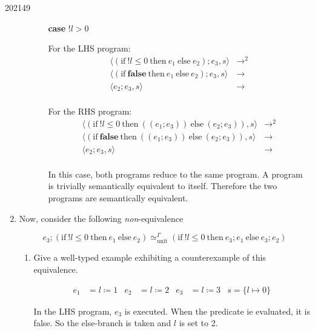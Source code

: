 \documentclass[10pt,\jkfside,a4paper]{article}
\begin{document}
\begin{examquestion}{2021}{4}{9}
\begin{enumerate}
\begin{enumerate}
\begin{itemize}
\item [\textbf{case}] $!l > 0$

For the LHS program:
\[
\begin{split}
\langle (\text{if} \ !l \leq 0 \ \text{then} \ e_1 \ \text{else} \ e_2);
e_3, s \rangle &\longrightarrow^2 \\
\langle (\text{if} \ \mathbf{false} \ \text{then} \ e_1 \ \text{else} \ e_2);
e_3, s \rangle &\longrightarrow \\
\langle e_2; e_3, s \rangle &\longrightarrow \\
\end{split}
\]

For the RHS program:
\[
\begin{split}
\langle (\text{if} \ !l \leq 0 \ \text{then} \ ((e_1; e_3)) \ \text{else} \
(e_2; e_3)), s \rangle &\longrightarrow^2\\
\langle (\text{if} \ \mathbf{false} \ \text{then} \ ((e_1; e_3)) \
\text{else} \
(e_2; e_3)), s \rangle &\longrightarrow \\
\langle e_2; e_3, s \rangle &\longrightarrow \\
\end{split}
\]

In this case, both programs reduce to the same program. A program is
trivially semantically equivalent to itself. Therefore the two programs are
semantically equivalent.

\end{itemize}

\end{enumerate}

\item Now, consider the following \textit{non}-equivalence

\[
e_3; (\text{if} \ !l \leq 0 \ \text{then} \ e_1 \ \text{else} \ e_2)
\simeq^{\Gamma}_{\text{unit}} (\text{if} \ !l \leq 0 \ \text{then} \ e_3;
e_1 \ \text{else} \ e_3; e_2)
\]

\begin{enumerate}

\item Give a well-typed example exhibiting a counterexample of this
equivalence.

\begin{align*}
e_1 &= l \coloneqq 1 &
e_2 &= l \coloneqq 2 &
e_3 &= l \coloneqq 3 &
s = \{l \mapsto 0\}
\end{align*}

In the LHS program, $e_3$ is executed. When the predicate ie evaluated, it is
false. So the else-branch is taken and $l$ is set to 2.


\end{enumerate}
\end{enumerate}
\end{examquestion}
\end{document}
